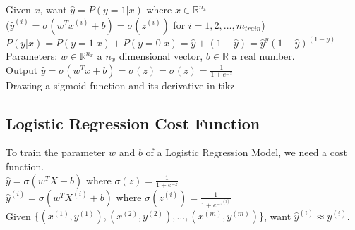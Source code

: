 \documentclass{article}
\begin{document}
    Given $x$, want $\hat{y} = P(y=1 |x)$ where $x \in \mathbb{R}^{n_x}$\\
    
    ($\hat{y}^{(i)} = \sigma(w^T x^{(i)} + b) = \sigma(z^{(i)})$ for $i = 1, 2, \dots ,m_{train}$)\\


    $P(y |x) = P(y=1|x) + P(y=0|x) = \hat{y} + (1-\hat{y}) = \hat{y}^y (1-\hat{y})^{(1-y)}$\\

    Parameters: $w \in \mathbb{R}^{n_x}$ a $n_x$ dimensional vector, $b \in \mathbb{R}$ a real number.\\

    Output $\hat{y} = \sigma(w^{T}x + b) = \sigma(z) = \sigma (z)=\frac {1}{1+e^{-z}}$\\

    Drawing a sigmoid function and its derivative in tikz\\

    \pgfplotsset{compat=1.16}


\newpage
\subsection{Logistic Regression Cost Function}

    To train the parameter $w$ and $b$ of a Logistic Regression Model, we need a cost function.\\

    $\hat{y} = \sigma{(w^{T}X + b)}$ where $\sigma(z) = \frac{1}{1+e^{-z}}$\\

    $\hat{y}^{(i)} = \sigma{(w^{T}X^{(i)} + b)}$ where $\sigma(z^{(i)}) = \frac{1}{1+e^{{-z}^{(i)}}}$\\

    Given $\{(x^{(1)}, y^{(1)}), (x^{(2)}, y^{(2)}), \hdots, (x^{(m)}, y^{(m)})\}$, want $\hat{y}^{(i)} \approx y^{(i)}$. \\
\end{document}
